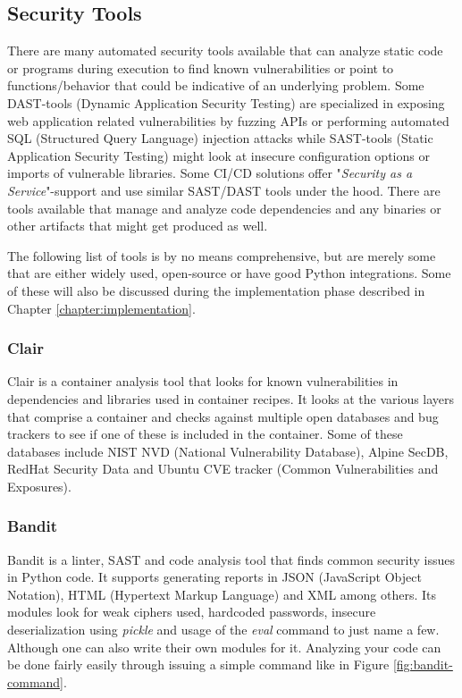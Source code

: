 \subsection{Security Tools} \label{subsec:security}
There are many automated security tools available that can analyze static code or programs during execution to find known vulnerabilities or point to functions/behavior that could be indicative of an underlying problem. Some DAST-tools (Dynamic Application Security Testing) are specialized in exposing web application related vulnerabilities by fuzzing APIs or performing automated SQL (Structured Query Language) injection attacks while SAST-tools (Static Application Security Testing) might look at insecure configuration options or imports of vulnerable libraries.\cite{owasp-tools,owasp-sast} Some CI/CD solutions offer "\textit{Security as a Service}"-support and use similar SAST/DAST tools under the hood.\cite{gitlab-sast,gitlab-dast} There are tools available that manage and analyze code dependencies and any binaries or other artifacts that might get produced as well.\cite{jfrog}

The following list of tools is by no means comprehensive, but are merely some that are either widely used, open-source or have good Python integrations. Some of these will also be discussed during the implementation phase described in Chapter \ref{chapter:implementation}.

\pagebreak

\subsubsection{Clair}
Clair is a container analysis tool that looks for known vulnerabilities in dependencies and libraries used in container recipes.\cite{clair,clair-scanner} It looks at the various layers that comprise a container and checks against multiple open databases and bug trackers to see if one of these is included in the container. Some of these databases include NIST NVD (National Vulnerability Database), Alpine SecDB, RedHat Security Data and Ubuntu CVE tracker (Common Vulnerabilities and Exposures).\cite{clair}

\subsubsection{Bandit}
Bandit is a linter, SAST and code analysis tool that finds common security issues in Python code.\cite{bandit} It supports generating reports in JSON (JavaScript Object Notation), HTML (Hypertext Markup Language) and XML among others. Its modules look for weak ciphers used, hardcoded passwords, insecure deserialization using \textit{pickle} and usage of the \textit{eval} command to just name a few. Although one can also write their own modules for it. Analyzing your code can be done fairly easily through issuing a simple command like in Figure \ref{fig:bandit-command}.

